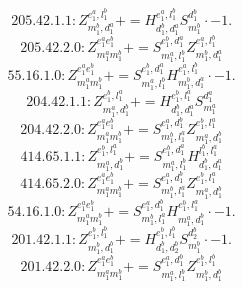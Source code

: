 \documentclass[letterpaper,10pt,fleqn,leqno,onecolumn]{article}
\begin{document}
\begin{equation} \;\;\;\;\;\;  205.42.1.1: Z^{e_{1}^{a},l_{1}^{b}}_{m_{1}^{b},d_{1}^{a}}+=H^{e_{1}^{a},l_{1}^{b}}_{d_{1}^{b},d_{1}^{a}}S^{d_{1}^{b}}_{m_{1}^{b}}\cdot -1. \end{equation}
\begin{equation} \;\;\;\;\;\;  205.42.2.0: Z^{e_{1}^{a}e_{1}^{b}}_{m_{1}^{a}m_{1}^{b}}+=S^{e_{1}^{b},d_{1}^{a}}_{m_{1}^{a},l_{1}^{b}}Z^{e_{1}^{a},l_{1}^{b}}_{m_{1}^{b},d_{1}^{a}} \end{equation}
\begin{equation} \;\;\;\;\;\;  55.16.1.0: Z^{e_{1}^{a}e_{1}^{b}}_{m_{1}^{a}m_{1}^{b}}+=S^{e_{1}^{b},d_{1}^{a}}_{m_{1}^{a},l_{1}^{b}}H^{e_{1}^{a},l_{1}^{b}}_{m_{1}^{b},d_{1}^{a}}\cdot -1. \end{equation}
\begin{equation} \;\;\;\;\;\;  204.42.1.1: Z^{e_{1}^{b},l_{1}^{a}}_{m_{1}^{a},d_{1}^{b}}+=H^{e_{1}^{b},l_{1}^{a}}_{d_{1}^{b},d_{1}^{a}}S^{d_{1}^{a}}_{m_{1}^{a}} \end{equation}
\begin{equation} \;\;\;\;\;\;  204.42.2.0: Z^{e_{1}^{a}e_{1}^{b}}_{m_{1}^{a}m_{1}^{b}}+=S^{e_{1}^{a},d_{1}^{b}}_{m_{1}^{b},l_{1}^{a}}Z^{e_{1}^{b},l_{1}^{a}}_{m_{1}^{a},d_{1}^{b}} \end{equation}
\begin{equation} \;\;\;\;\;\;  414.65.1.1: Z^{e_{1}^{b},l_{1}^{a}}_{m_{1}^{a},d_{1}^{b}}+=S^{e_{1}^{b},d_{1}^{a}}_{m_{1}^{a},l_{1}^{b}}H^{l_{1}^{b},l_{1}^{a}}_{d_{1}^{b},d_{1}^{a}} \end{equation}
\begin{equation} \;\;\;\;\;\;  414.65.2.0: Z^{e_{1}^{a}e_{1}^{b}}_{m_{1}^{a}m_{1}^{b}}+=S^{e_{1}^{a},d_{1}^{b}}_{m_{1}^{b},l_{1}^{a}}Z^{e_{1}^{b},l_{1}^{a}}_{m_{1}^{a},d_{1}^{b}} \end{equation}
\begin{equation} \;\;\;\;\;\;  54.16.1.0: Z^{e_{1}^{a}e_{1}^{b}}_{m_{1}^{a}m_{1}^{b}}+=S^{e_{1}^{a},d_{1}^{b}}_{m_{1}^{b},l_{1}^{a}}H^{e_{1}^{b},l_{1}^{a}}_{m_{1}^{a},d_{1}^{b}}\cdot -1. \end{equation}
\begin{equation} \;\;\;\;\;\;  201.42.1.1: Z^{e_{1}^{b},l_{1}^{b}}_{m_{1}^{b},d_{1}^{b}}+=H^{e_{1}^{b},l_{1}^{b}}_{d_{1}^{b},d_{2}^{b}}S^{d_{2}^{b}}_{m_{1}^{b}}\cdot -1. \end{equation}
\begin{equation} \;\;\;\;\;\;  201.42.2.0: Z^{e_{1}^{a}e_{1}^{b}}_{m_{1}^{a}m_{1}^{b}}+=S^{e_{1}^{a},d_{1}^{b}}_{m_{1}^{a},l_{1}^{b}}Z^{e_{1}^{b},l_{1}^{b}}_{m_{1}^{b},d_{1}^{b}} \end{equation}
\end{document}
